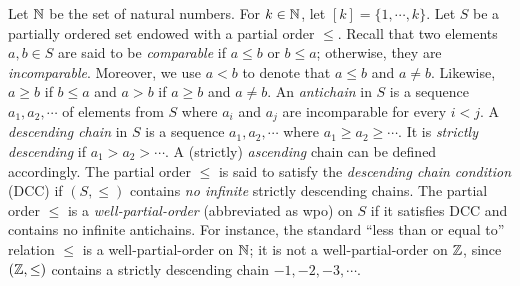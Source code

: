 
Let ${\mathbb{N} }$ be the set of natural numbers. For $k \in {\mathbb{N} }$, let $[k]=\{1,\cdots, k\}$. %
%
Let $S$ be a partially ordered set endowed with a partial order $\leq$. Recall that two elements $a,b\in S$ are said to be \emph{comparable} if $a\leq b$ or $b\leq a$; otherwise, they are \emph{incomparable}.
Moreover, we use $a < b$ to denote that $a \leq b$ and $a \neq b$. Likewise, $a \geq b$ if $b \leq a$ and $a > b$ if $a \geq b$ and $a \neq b$.
%
An \emph{antichain} in $S$ is a sequence $a_1, a_2, \cdots$ of elements from $S$ where $a_i$ and $a_j$ are incomparable for every $ i < j$.
A \emph{descending chain} in $S$ is a sequence $a_1, a_2, \cdots$ where $a_1 \geq a_2 \geq \cdots$. It is \emph{strictly descending} if $a_1 > a_2 > \cdots$. 
A (strictly) \emph{ascending} chain can be defined accordingly.  
%
The partial order $\leq$ is said to satisfy %
the \emph{descending chain condition} (DCC) if $(S, \leq)$ contains \emph{no infinite} strictly descending chains.
%
The partial order $\leq$ is a \emph{well-partial-order} (abbreviated as wpo) on $S$ if it satisfies DCC and contains no infinite antichains. 
%
%
%
For instance, the standard ``less than or equal to'' relation $\leq$ is a well-partial-order on $\mathbb{N}$; it is not a well-partial-order on $\mathbb{Z}$, since $(\mathbb{Z}, \leq)$ contains a strictly descending chain $-1, -2, -3, \cdots$. 



